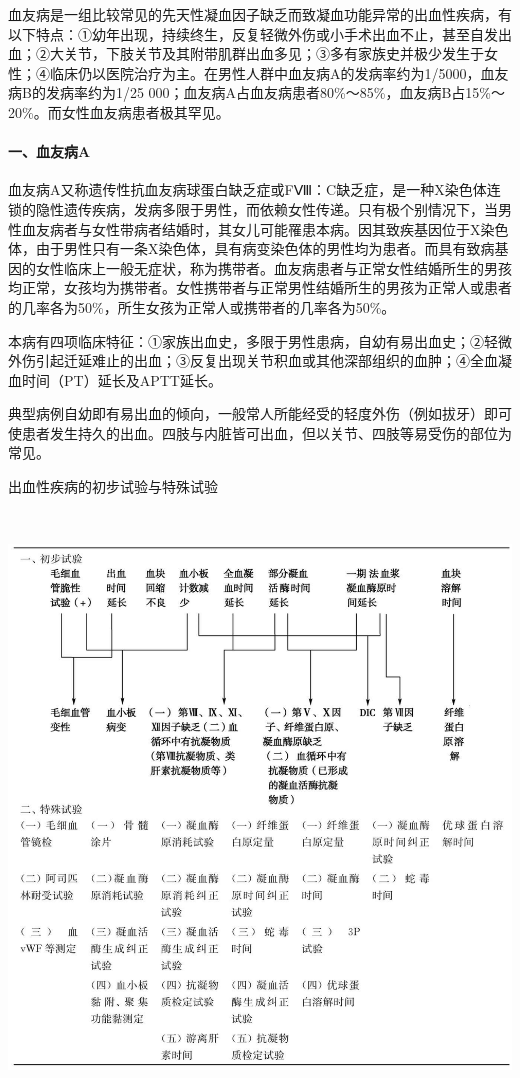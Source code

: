 血友病是一组比较常见的先天性凝血因子缺乏而致凝血功能异常的出血性疾病，有以下特点：①幼年出现，持续终生，反复轻微外伤或小手术出血不止，甚至自发出血；②大关节，下肢关节及其附带肌群出血多见；③多有家族史并极少发生于女性；④临床仍以医院治疗为主。在男性人群中血友病A的发病率约为1/5000，血友病B的发病率约为1/25
000；血友病A占血友病患者80\%～85\%，血友病B占15\%～20\%。而女性血友病患者极其罕见。

\paragraph{一、血友病A}

血友病A又称遗传性抗血友病球蛋白缺乏症或FⅧ：C缺乏症，是一种X染色体连锁的隐性遗传疾病，发病多限于男性，而依赖女性传递。只有极个别情况下，当男性血友病者与女性带病者结婚时，其女儿可能罹患本病。因其致疾基因位于X染色体，由于男性只有一条X染色体，具有病变染色体的男性均为患者。而具有致病基因的女性临床上一般无症状，称为携带者。血友病患者与正常女性结婚所生的男孩均正常，女孩均为携带者。女性携带者与正常男性结婚所生的男孩为正常人或患者的几率各为50\%，所生女孩为正常人或携带者的几率各为50\%。

本病有四项临床特征：①家族出血史，多限于男性患病，自幼有易出血史；②轻微外伤引起迁延难止的出血；③反复出现关节积血或其他深部组织的血肿；④全血凝血时间（PT）延长及APTT延长。

典型病例自幼即有易出血的倾向，一般常人所能经受的轻度外伤（例如拔牙）即可使患者发生持久的出血。四肢与内脏皆可出血，但以关节、四肢等易受伤的部位为常见。

\begin{table}[htbp]
\centering
\caption{出血性疾病的初步试验与特殊试验}
\label{tab34-5}
\includegraphics[width=5.91667in,height=6.17708in]{./images/Image00200.jpg}
\end{table}

